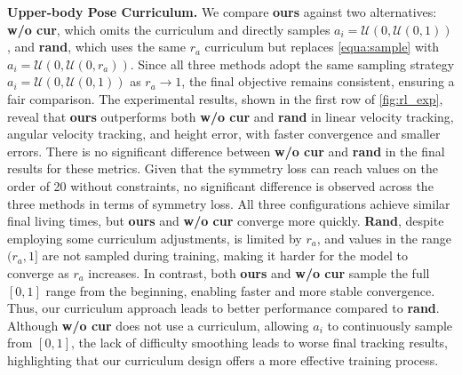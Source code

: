 \textbf{Upper-body Pose Curriculum.} We compare \textbf{ours} against two alternatives: \textbf{w/o cur}, which omits the curriculum and directly samples $a_i=\mathcal{U}(0,\mathcal{U}(0,1))$, and \textbf{rand}, which uses the same $r_a$ curriculum but replaces \cref{equa:sample} with $a_i=\mathcal{U}(0,\mathcal{U}(0,r_a))$. Since all three methods adopt the same sampling strategy $a_i=\mathcal{U}(0,\mathcal{U}(0,1))$ as $r_a\rightarrow1$, the final objective remains consistent, ensuring a fair comparison. The experimental results, shown in the first row of \cref{fig:rl_exp}, reveal that \textbf{ours} outperforms both \textbf{w/o cur} and \textbf{rand} in linear velocity tracking, angular velocity tracking, and height error, with faster convergence and smaller errors. There is no significant difference between \textbf{w/o cur} and \textbf{rand} in the final results for these metrics. Given that the symmetry loss can reach values on the order of 20 without constraints, no significant difference is observed across the three methods in terms of symmetry loss. All three configurations achieve similar final living times, but \textbf{ours} and \textbf{w/o cur} converge more quickly. \textbf{Rand}, despite employing some curriculum adjustments, is limited by $r_a$, and values in the range $(r_a,1]$ are not sampled during training, making it harder for the model to converge as $r_a$ increases. In contrast, both \textbf{ours} and \textbf{w/o cur} sample the full $[0,1]$ range from the beginning, enabling faster and more stable convergence. Thus, our curriculum approach leads to better performance compared to \textbf{rand}. Although \textbf{w/o cur} does not use a curriculum, allowing $a_i$ to continuously sample from $[0,1]$, the lack of difficulty smoothing leads to worse final tracking results, highlighting that our curriculum design offers a more effective training process.

